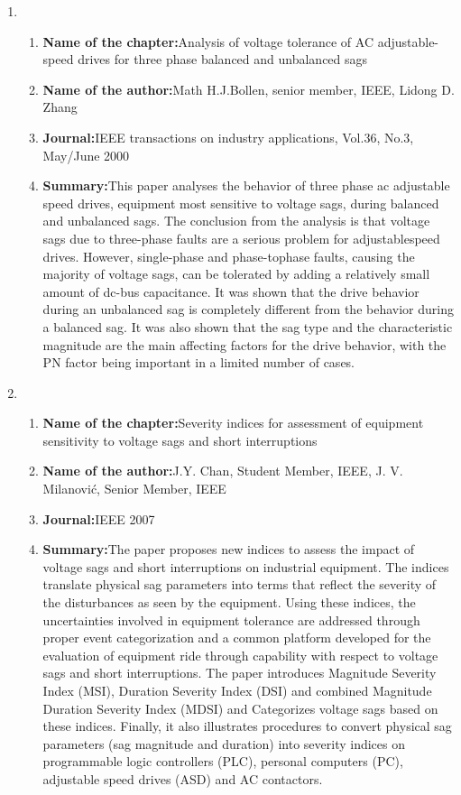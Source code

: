 \documentclass[12pt, a4paper]{extreport}
\begin{document}
\begin{enumerate}
     \item
    \begin{enumerate}
    \item{\textbf{Name of the chapter:}}Analysis of
voltage
tolerance of AC
adjustable-speed
drives for three
phase balanced
and unbalanced
sags
\item{\textbf{Name of the author:}}Math
H.J.Bollen,
senior member,
IEEE,
Lidong D.
Zhang
\item{\textbf{Journal:}}IEEE
transactions
on industry
applications,
Vol.36, No.3,
May/June
2000
\item{\textbf{Summary:}}This paper analyses the
behavior of three phase ac
adjustable speed drives,
equipment most sensitive
to voltage sags, during
balanced and unbalanced
sags. The conclusion from
the analysis is that voltage
sags due to three-phase
faults are a serious
problem for adjustablespeed
drives. However,
single-phase and phase-tophase
faults, causing the
majority of voltage sags,
can be tolerated by adding
a relatively small amount
of dc-bus capacitance. It
was shown that the drive
behavior during an
unbalanced sag is
completely different from
the behavior during a
balanced sag. It was also shown that the sag type
and the characteristic
magnitude are the main
affecting factors for the
drive behavior, with the
PN factor being important
in a limited number of 
cases.

    \end{enumerate}
     \item
    \begin{enumerate}
    \item{\textbf{Name of the chapter:}}Severity indices
for assessment
of equipment
sensitivity to
voltage sags and
short
interruptions

 \item{\textbf{Name of the author:}}J.Y. Chan,
Student
Member, IEEE,
J. V. Milanović,
Senior Member,
IEEE
\item{\textbf{Journal:}}IEEE 2007
\item{\textbf{Summary:}}The paper proposes new
indices to assess the
impact of voltage sags
and short interruptions on
industrial equipment. The
indices translate physical
sag parameters into terms
that reflect the severity of
the disturbances as seen
by the equipment. Using
these indices, the
uncertainties involved in
equipment tolerance are
addressed through proper
event categorization and a
common platform
developed for the
evaluation of equipment
ride through capability
with respect to voltage
sags and short
interruptions. The paper
introduces Magnitude
Severity Index (MSI),
Duration Severity Index
(DSI) and combined
Magnitude Duration
Severity Index (MDSI)
and Categorizes voltage
sags based on these
indices. Finally, it also
illustrates procedures to
convert physical sag
parameters (sag
magnitude and duration)
into severity indices on
programmable logic controllers (PLC),
personal computers (PC),
adjustable speed drives
(ASD) and AC contactors. 
    \end{enumerate}
         \end{enumerate}
\end{document}
